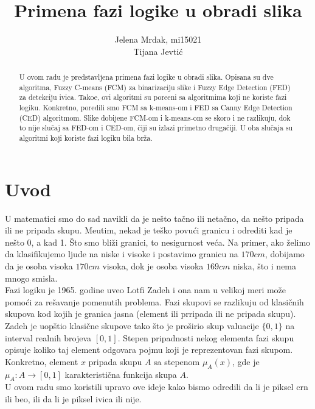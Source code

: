 \documentclass[12pt,a4paper]{article}
\title{Primena fazi logike u obradi slika}
\author{Jelena Mrdak, mi15021\\ Tijana Jevti\' c}
\theoremstyle{definition}
\theoremstyle{remark}
\theoremstyle{plain}
\begin{document}
\maketitle

\begin{abstract}
  U ovom radu je predstavljena primena fazi logike u obradi slika. Opisana su dve algoritma, Fuzzy C-means (FCM) za binarizaciju slike i Fuzzy Edge Detection (FED) za detekciju ivica. Tako\dj e, ovi algoritmi su pore\dj eni sa algoritmima koji ne koriste fazi logiku. Konkretno, poredili smo FCM sa k-means-om i FED sa Canny Edge Detection (CED) algoritmom. Slike dobijene FCM-om i k-means-om se skoro i ne razlikuju, dok to nije slu\v caj sa FED-om i CED-om, \v ciji su izlazi primetno druga\v ciji. U oba slu\v caja su algoritmi koji koriste fazi logiku bila br\v za.
\end{abstract}

\tableofcontents

\section{Uvod}
U matematici smo do sad navikli da je ne\v sto ta\v cno ili neta\v cno, da ne\v sto pripada ili ne pripada skupu. Me\dj utim, nekad je te\v sko povu\' ci granicu i odrediti kad je ne\v sto 0, a kad 1. \v Sto smo bli\v zi granici, to nesigurnost ve\' ca. Na primer, ako \v zelimo da klasifikujemo ljude na niske i visoke i postavimo granicu na $170 cm$, dobijamo da je osoba visoka $170 cm$ visoka, dok je osoba visoka $169 cm$ niska, \v sto i nema mnogo smisla.\\

Fazi logiku je 1965. godine uveo Lotfi Zadeh i ona nam u velikoj meri mo\v ze pomo\' ci za re\v savanje pomenutih problema. Fazi skupovi se razlikuju od klasi\v cnih skupova kod kojih je granica jasna (element ili prripada ili ne pripada skupu). Zadeh je uop\v stio klasi\v cne skupove tako \v sto je pro\v sirio skup valuacije $\{0, 1\}$ na interval realnih brojeva $[0, 1]$. Stepen pripadnosti nekog elementa fazi skupu opisuje koliko taj element odgovara pojmu koji je reprezentovan fazi skupom. Konkretno, element $x$ pripada skupu $A$ sa stepenom $\mu_{A}(x)$, gde je $\mu_{A} : A \rightarrow [0, 1]$ karakteristi\v cna funkcija skupa $A$.\\

U ovom radu smo koristili upravo ove ideje kako bismo odredili da li je piksel crn ili beo, ili da li je piksel ivica ili nije.\\
\end{document}
